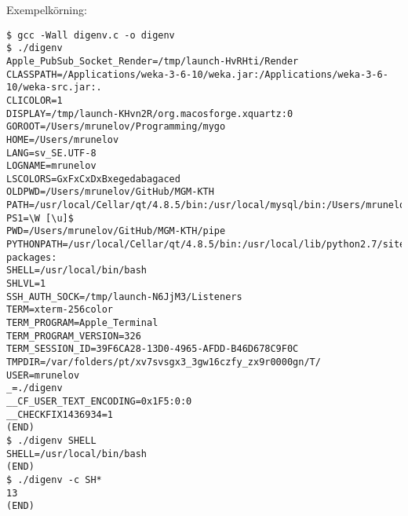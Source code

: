\documentclass[paper=a4, fontsize=11pt]{scrartcl} %
\numberwithin{equation}{section} %
\numberwithin{figure}{section} %
\numberwithin{table}{section} %
\begin{document}
Exempelkörning:\\

\begin{verbatim}
$ gcc -Wall digenv.c -o digenv
$ ./digenv 
Apple_PubSub_Socket_Render=/tmp/launch-HvRHti/Render
CLASSPATH=/Applications/weka-3-6-10/weka.jar:/Applications/weka-3-6-10/weka-src.jar:.
CLICOLOR=1
DISPLAY=/tmp/launch-KHvn2R/org.macosforge.xquartz:0
GOROOT=/Users/mrunelov/Programming/mygo
HOME=/Users/mrunelov
LANG=sv_SE.UTF-8
LOGNAME=mrunelov
LSCOLORS=GxFxCxDxBxegedabagaced
OLDPWD=/Users/mrunelov/GitHub/MGM-KTH
PATH=/usr/local/Cellar/qt/4.8.5/bin:/usr/local/mysql/bin:/Users/mrunelov/scripts:/opt/local/bin:/opt/local/sbin:/usr/local/bin:/usr/local/google_appengine:/usr/local:/Library/Frameworks/Python.framework/Versions/2.7/bin:/usr/local/bin:/usr/bin:/bin:/usr/sbin:/sbin:/opt/X11/bin:/usr/local/go/bin:/usr/texbin:/Users/mrunelov/Programming/mygo/bin:/usr/local/go/bin
PS1=\W [\u]$ 
PWD=/Users/mrunelov/GitHub/MGM-KTH/pipe
PYTHONPATH=/usr/local/Cellar/qt/4.8.5/bin:/usr/local/lib/python2.7/site-packages:
SHELL=/usr/local/bin/bash
SHLVL=1
SSH_AUTH_SOCK=/tmp/launch-N6JjM3/Listeners
TERM=xterm-256color
TERM_PROGRAM=Apple_Terminal
TERM_PROGRAM_VERSION=326
TERM_SESSION_ID=39F6CA28-13D0-4965-AFDD-B46D678C9F0C
TMPDIR=/var/folders/pt/xv7svsgx3_3gw16czfy_zx9r0000gn/T/
USER=mrunelov
_=./digenv
__CF_USER_TEXT_ENCODING=0x1F5:0:0
__CHECKFIX1436934=1
(END) 
$ ./digenv SHELL
SHELL=/usr/local/bin/bash
(END) 
$ ./digenv -c SH*
13
(END)
\end{verbatim}

\end{document}
